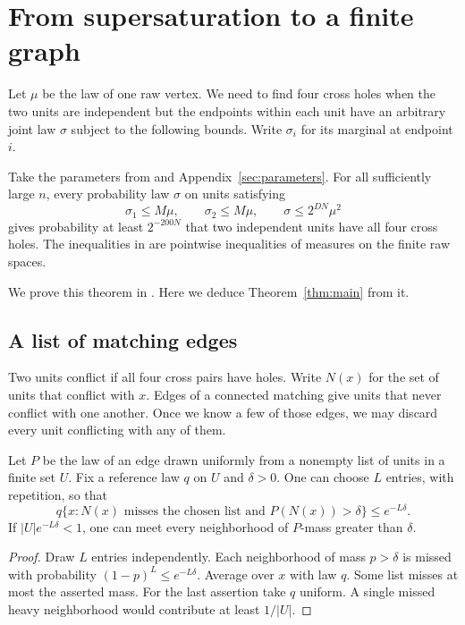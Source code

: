 \section{From supersaturation to a finite graph}\label{sec:distributions}

Let \(\mu\) be the law of one raw vertex. We need to find four cross
holes when the two units are independent but the endpoints within each
unit have an arbitrary joint law \(\sigma\) subject to the following
bounds. Write \(\sigma_i\) for its marginal at endpoint \(i\).

\begin{theorem}\label{thm:raw-supersaturation}
Take the parameters from  and
Appendix~\ref{sec:parameters}. For all sufficiently large \(n\), every
probability law \(\sigma\) on units satisfying
\begin{equation}\label{eq:raw-law-caps}
 \sigma_1\le M\mu,\qquad \sigma_2\le M\mu,\qquad
 \sigma\le 2^{DN}\mu^2
\end{equation}
gives probability at least \(2^{-200N}\) that two independent units have all four cross holes.
The inequalities in  are pointwise inequalities of measures on the finite raw spaces.
\end{theorem}

We prove this theorem in . Here we deduce
Theorem~\ref{thm:main} from it.

\subsection{A list of matching edges}

Two units conflict if all four cross pairs have holes. Write \(N(x)\) for
the set of units that conflict with \(x\). Edges of a connected matching
give units that never conflict with one another. Once we know a few of those edges, we may discard every unit
conflicting with any of them.

\begin{lemma}\label{lem:matching-neighborhoods}
Let \(P\) be the law of an edge drawn uniformly from a nonempty list of
units in a finite set \(U\). Fix a reference law \(q\) on \(U\) and
\(\delta>0\). One can choose \(L\) entries, with repetition, so that
\[
 q\{x:N(x)\text{ misses the chosen list and }P(N(x))>\delta\}
 \le e^{-L\delta}.
\]
If \(|U|e^{-L\delta}<1\), one can meet every neighborhood of
\(P\)-mass greater than \(\delta\).
\end{lemma}
\begin{proof}
Draw \(L\) entries independently. Each neighborhood of mass \(p>\delta\)
is missed with probability \((1-p)^L\le e^{-L\delta}\).
Average over \(x\) with law \(q\). Some list misses at most the asserted mass.
For the last assertion take \(q\) uniform. A single missed heavy
neighborhood would contribute at least \(1/|U|\).
\end{proof}

